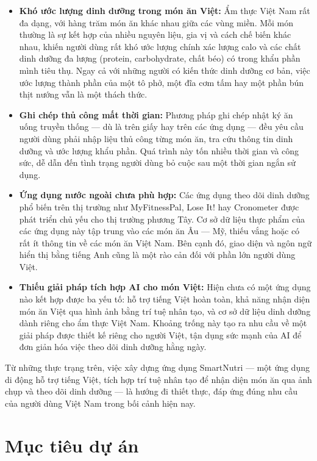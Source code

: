 \begin{itemize}
    \item \textbf{Khó ước lượng dinh dưỡng trong món ăn Việt:} Ẩm thực Việt Nam rất đa dạng, với hàng trăm món ăn khác nhau giữa các vùng miền. Mỗi món thường là sự kết hợp của nhiều nguyên liệu, gia vị và cách chế biến khác nhau, khiến người dùng rất khó ước lượng chính xác lượng calo và các chất dinh dưỡng đa lượng (protein, carbohydrate, chất béo) có trong khẩu phần mình tiêu thụ. Ngay cả với những người có kiến thức dinh dưỡng cơ bản, việc ước lượng thành phần của một tô phở, một đĩa cơm tấm hay một phần bún thịt nướng vẫn là một thách thức.

    \item \textbf{Ghi chép thủ công mất thời gian:} Phương pháp ghi chép nhật ký ăn uống truyền thống — dù là trên giấy hay trên các ứng dụng — đều yêu cầu người dùng phải nhập liệu thủ công từng món ăn, tra cứu thông tin dinh dưỡng và ước lượng khẩu phần. Quá trình này tốn nhiều thời gian và công sức, dễ dẫn đến tình trạng người dùng bỏ cuộc sau một thời gian ngắn sử dụng.

    \item \textbf{Ứng dụng nước ngoài chưa phù hợp:} Các ứng dụng theo dõi dinh dưỡng phổ biến trên thị trường như MyFitnessPal, Lose It! hay Cronometer được phát triển chủ yếu cho thị trường phương Tây. Cơ sở dữ liệu thực phẩm của các ứng dụng này tập trung vào các món ăn Âu — Mỹ, thiếu vắng hoặc có rất ít thông tin về các món ăn Việt Nam. Bên cạnh đó, giao diện và ngôn ngữ hiển thị bằng tiếng Anh cũng là một rào cản đối với phần lớn người dùng Việt.

    \item \textbf{Thiếu giải pháp tích hợp AI cho món Việt:} Hiện chưa có một ứng dụng nào kết hợp được ba yếu tố: hỗ trợ tiếng Việt hoàn toàn, khả năng nhận diện món ăn Việt qua hình ảnh bằng trí tuệ nhân tạo, và cơ sở dữ liệu dinh dưỡng dành riêng cho ẩm thực Việt Nam. Khoảng trống này tạo ra nhu cầu về một giải pháp được thiết kế riêng cho người Việt, tận dụng sức mạnh của AI để đơn giản hóa việc theo dõi dinh dưỡng hằng ngày.
\end{itemize}

Từ những thực trạng trên, việc xây dựng ứng dụng SmartNutri — một ứng dụng di động hỗ trợ tiếng Việt, tích hợp trí tuệ nhân tạo để nhận diện món ăn qua ảnh chụp và theo dõi dinh dưỡng — là hướng đi thiết thực, đáp ứng đúng nhu cầu của người dùng Việt Nam trong bối cảnh hiện nay.

\section{Mục tiêu dự án}

